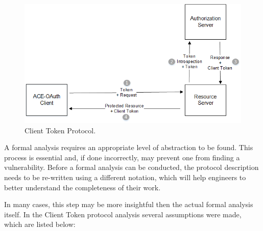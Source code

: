\documentclass[peerreview, a4paper, 7pt]{IEEEtran}
\begin{document}
\begin{figure}[!htbp]
	\centering
	\includegraphics[scale=0.70]{client-token.png}
	\caption{Client Token Protocol.}
	\label{client-token-figure}
\end{figure}

A formal analysis requires an appropriate level of abstraction to be found. This process is essential and, if done incorrectly, may prevent one from finding a vulnerability. Before a formal analysis can be conducted, the protocol description needs to be re-written using a different notation, which will help engineers to better understand the completeness of their work.

In many cases, this step may be more insightful then the actual formal analysis itself. In the Client Token protocol analysis several assumptions were made, which are listed below: \\
\end{document}
